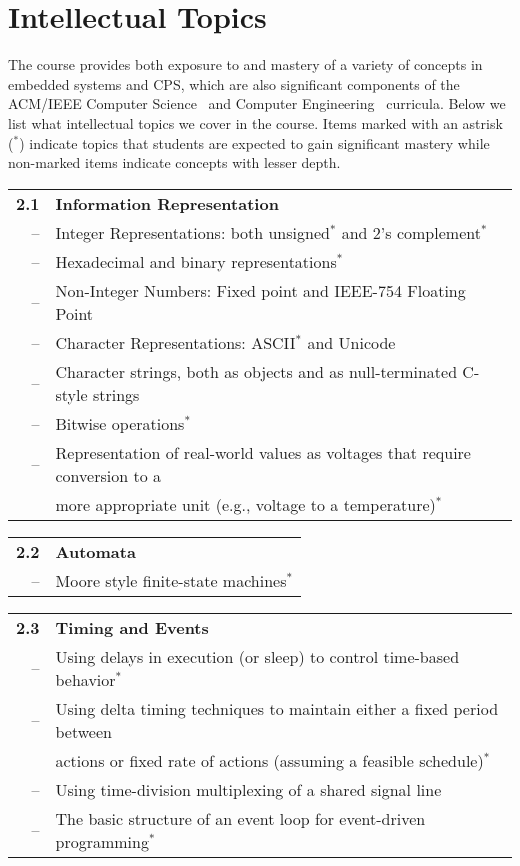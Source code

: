 \section{Intellectual Topics}
\label{sec:topics}

The course provides both exposure to and mastery of a variety of concepts
in embedded systems and CPS, which are also significant components
of the ACM/IEEE
Computer Science~\cite{cs13} and Computer Engineering~\cite{ce16} curricula.
Below we list what intellectual topics we cover in the course.
Items marked with an astrisk ($^*$)
indicate topics that students are expected to gain significant mastery
while non-marked items indicate concepts with lesser depth.

\vspace{0.1in}
\noindent
\begin{tabular}{r l}
{\bf 2.1} & {\bf Information Representation} \\
-- & Integer Representations: both unsigned$^*$ and 2's complement$^*$ \\
-- & Hexadecimal and binary representations$^*$ \\
-- & Non-Integer Numbers: Fixed point and IEEE-754 Floating Point \\
-- & Character Representations: ASCII$^*$ and Unicode \\
-- & Character strings, both as objects and as null-terminated C-style strings \\
-- &  Bitwise operations$^*$ \\
-- & Representation of real-world values as voltages that require conversion to a\\
\  & more appropriate unit (e.g., voltage to a temperature)$^*$
\end{tabular}

\noindent
\begin{tabular}{r l}
{\bf 2.2} & {\bf Automata}\\
-- & Moore style finite-state machines$^*$
\end{tabular}

\vspace{0.1in}
\noindent
\begin{tabular}{r l}
{\bf 2.3} & {\bf Timing and Events} \\
-- & Using delays in execution (or sleep) to control time-based behavior$^*$ \\
-- & Using delta timing techniques to maintain either a fixed period between \\
\  & actions or fixed rate of actions (assuming a feasible schedule)$^*$ \\
-- & Using time-division multiplexing of a shared signal line \\
-- & The basic structure of an event loop for event-driven programming$^*$
\end{tabular}

